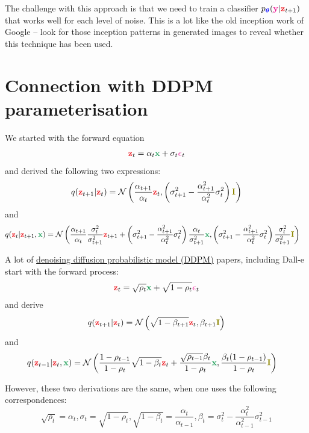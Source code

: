 \documentclass[usenames,dvipsnames]{article}
\newcommand{\myvec}[1]{\mathbf{#1}}
\newcommand{\myvecsym}[1]{\boldsymbol{#1}}
\newcommand{\vx}{\myvec{\textcolor{ForestGreen}{x}}}
\newcommand{\vz}{\myvec{\textcolor{Red}{z}}}
\newcommand{\vy}{\myvec{\textcolor{Magenta}{y}}}
\newcommand{\vI}{\myvec{\textcolor{olive}{I}}}
\newcommand{\vtheta}{\myvecsym{\textcolor{blue}{\theta}}}
\newcommand{\vepsilon}{\myvecsym{\textcolor{CarnationPink}{\epsilon}}}
\newcommand{\gauss}{\mathcal{N}}
\newcommand{\pT}{p_{\vtheta}}
\newcommand{\be}{\begin{equation}}
\newcommand{\ee}{\end{equation}}
\begin{document}
The challenge with this approach is that we need to train a classifier $\pT(\vy | \vz_{t+1} )$ that works well for each level of noise. This is a lot like the old inception work of Google -- look for those inception patterns in generated images to reveal whether this technique has been used.


\section{Connection with DDPM parameterisation}

We started with the forward equation
\begin{align}
\vz_t = \alpha_t \vx + \sigma_t \vepsilon_t \nonumber
\end{align}
and derived the following two expressions:
\be
q(\vz_{t+1} | \vz_t) = \gauss\left(\frac{\alpha_{t+1}}{\alpha_t} \vz_t, \left(\sigma_{t+1}^2 - \frac{\alpha_{t+1}^2}{\alpha_t^2}\sigma_t^2\right) \vI\right) \nonumber
\ee
and
\begin{align}
q(\vz_{t}|\vz_{t+1}, \vx) &= \mathcal{N}\left(
\frac{\alpha_{t+1}}{\alpha_{t}} \frac{\sigma_{t}^2}{\sigma_{t+1}^2} \vz_{t+1}
+ \left(\sigma_{t+1}^2 - \frac{\alpha_{t+1}^2}{\alpha_t^2} \sigma_t^2\right)  \frac{\alpha_{t}}{\sigma^2_{t+1}} \vx,
\left(\sigma_{t+1}^2 - \frac{\alpha_{t+1}^2}{\alpha_t^2} \sigma_t^2\right) \frac{\sigma_{t}^2}{\sigma_{t+1}^2} \vI\right) \nonumber
\end{align}




A lot of \href{https://arxiv.org/abs/2006.11239}{denoising diffusion probabilistic model (DDPM)} papers, including Dall-e start with the forward process:  
\begin{align}
\vz_t = \sqrt{\rho_t} \vx + \sqrt{1 - \rho_t}  \vepsilon_t \nonumber
\end{align}
and derive
\be
q(\vz_{t+1} | \vz_t) = \gauss\left( \sqrt{1-\beta_{t+1}} \vz_t, \beta_{t+1}  \vI\right) \nonumber
\ee
and
\begin{align}
q(\vz_{t-1}|\vz_{t}, \vx) &= \mathcal{N}\left(
\frac{1-\rho_{t-1}}{1-\rho_t} \sqrt{1-\beta_t} \vz_{t}
+   \frac{\sqrt{\rho_{t-1}} \beta_t}{ 1-\rho_t} \vx,
 \frac{\beta_t(1-\rho_{t-1})}{1-\rho_t} \vI\right) \nonumber
\end{align}

However, these two derivations are the same, when one uses the following correspondences:
\be
\sqrt{\rho_t} = \alpha_t, \sigma_t = \sqrt{1-\rho_t}, \sqrt{1-\beta_t} = \frac{\alpha_t}{\alpha_{t-1}}, \beta_t = \sigma_t^2 - \frac{\alpha_t^2}{\alpha_{t-1}^2} \sigma_{t-1}^2
\ee
\end{document}
